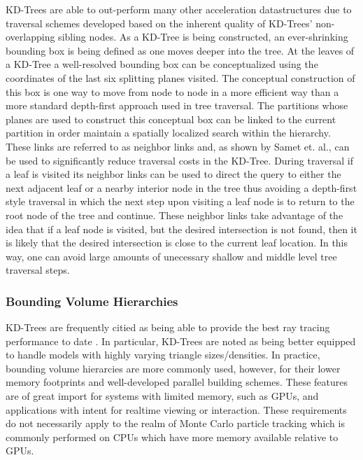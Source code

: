 \documentclass[12pt, a4paper]{article}
\begin{document}
KD-Trees are able to out-perform many other acceleration datastructures due to traversal schemes developed based on the inherent quality of KD-Trees' non-overlapping sibling nodes. As a KD-Tree is being constructed, an ever-shrinking bounding box is being defined as one moves deeper into the tree. At the leaves of a KD-Tree a well-resolved bounding box can be conceptualized using the coordinates of the last six splitting planes visited. The conceptual construction of this box is one way to move from node to node in a more efficient way than a more standard depth-first approach used in tree traversal. The partitions whose planes are used to construct this conceptual box can be linked to the current partition in order maintain a spatially localized search within the hierarchy. These links are referred to as neighbor links and, as shown by Samet et. al.\cite{Samet_1989}, can be used to significantly reduce traversal costs in the KD-Tree. During traversal if a leaf is visited its neighbor links can be used to direct the query to either the next adjacent leaf or a nearby interior node in the tree thus avoiding a depth-first style traversal in which the next step upon visiting a leaf node is to return to the root node of the tree and continue. These neighbor links take advantage of the idea that if a leaf node is visited, but the desired intersection is not found, then it is likely that the desired intersection is close to the current leaf location. In this way, one can avoid large amounts of unecessary shallow and middle level tree traversal steps.

\subsubsection{Bounding Volume Hierarchies}%

KD-Trees are frequently citied as being able to provide the best ray tracing performance to date \cite{Ernst_2007,Hurley_2002,Havran_2000}. In particular, KD-Trees are noted as being better equipped to handle models with highly varying triangle sizes/densities. In practice, bounding volume hierarcies are more commonly used, however, for their lower memory footprints and well-developed parallel building schemes. These features are of great import for systems with limited memory, such as GPUs, and applications with intent for realtime viewing or interaction. These requirements do not necessarily apply to the realm of Monte Carlo particle tracking which is commonly performed on CPUs which have more memory available relative to GPUs.
\end{document}
